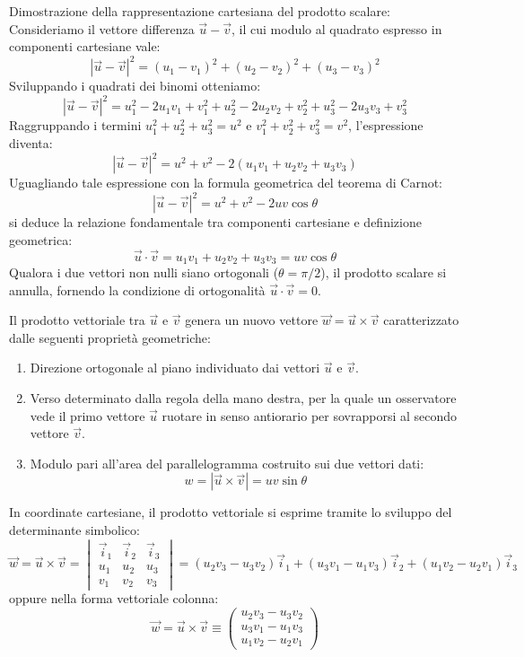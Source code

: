\documentclass[12pt, a4paper]{article}
\begin{document}
Dimostrazione della rappresentazione cartesiana del prodotto scalare:
Consideriamo il vettore differenza $\vec{u} - \vec{v}$, il cui modulo al quadrato espresso in componenti cartesiane vale:
\[
|\vec{u} - \vec{v}|^2 = (u_1 - v_1)^2 + (u_2 - v_2)^2 + (u_3 - v_3)^2
\]
Sviluppando i quadrati dei binomi otteniamo:
\[
|\vec{u} - \vec{v}|^2 = u_1^2 - 2u_1 v_1 + v_1^2 + u_2^2 - 2u_2 v_2 + v_2^2 + u_3^2 - 2u_3 v_3 + v_3^2
\]
Raggruppando i termini $u_1^2 + u_2^2 + u_3^2 = u^2$ e $v_1^2 + v_2^2 + v_3^2 = v^2$, l'espressione diventa:
\[
|\vec{u} - \vec{v}|^2 = u^2 + v^2 - 2(u_1 v_1 + u_2 v_2 + u_3 v_3)
\]
Uguagliando tale espressione con la formula geometrica del teorema di Carnot:
\[
|\vec{u} - \vec{v}|^2 = u^2 + v^2 - 2uv \cos\theta
\]
si deduce la relazione fondamentale tra componenti cartesiane e definizione geometrica:
\[
\vec{u} \cdot \vec{v} = u_1 v_1 + u_2 v_2 + u_3 v_3 = uv \cos\theta
\]
Qualora i due vettori non nulli siano ortogonali ($\theta = \pi/2$), il prodotto scalare si annulla, fornendo la condizione di ortogonalità $\vec{u} \cdot \vec{v} = 0$.

Il prodotto vettoriale tra $\vec{u}$ e $\vec{v}$ genera un nuovo vettore $\vec{w} = \vec{u} \times \vec{v}$ caratterizzato dalle seguenti proprietà geometriche:
\begin{enumerate}
    \item Direzione ortogonale al piano individuato dai vettori $\vec{u}$ e $\vec{v}$.
    \item Verso determinato dalla regola della mano destra, per la quale un osservatore vede il primo vettore $\vec{u}$ ruotare in senso antiorario per sovrapporsi al secondo vettore $\vec{v}$.
    \item Modulo pari all'area del parallelogramma costruito sui due vettori dati:
    \[
    w = |\vec{u} \times \vec{v}| = uv \sin\theta
    \]
\end{enumerate}

In coordinate cartesiane, il prodotto vettoriale si esprime tramite lo sviluppo del determinante simbolico:
\[
\vec{w} = \vec{u} \times \vec{v} = \begin{vmatrix} \vec{i}_1 & \vec{i}_2 & \vec{i}_3 \\ u_1 & u_2 & u_3 \\ v_1 & v_2 & v_3 \end{vmatrix} = (u_2 v_3 - u_3 v_2)\vec{i}_1 + (u_3 v_1 - u_1 v_3)\vec{i}_2 + (u_1 v_2 - u_2 v_1)\vec{i}_3
\]
oppure nella forma vettoriale colonna:
\[
\vec{w} = \vec{u} \times \vec{v} \equiv \begin{pmatrix} u_2 v_3 - u_3 v_2 \\ u_3 v_1 - u_1 v_3 \\ u_1 v_2 - u_2 v_1 \end{pmatrix}
\]
\end{document}

